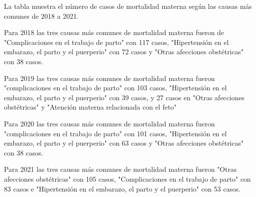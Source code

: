 \justifying La tabla muestra el número de casos de mortalidad materna según las causas más comunes de 2018 a 2021. 

Para 2018 las tres causas más comunes de mortalidad materna fueron de  "Complicaciones en el trabajo de parto" con 117 casos, "Hipertensión en el embarazo, el parto y el puerperio" con 72 casos y "Otras afecciones obstétricas" con 38 casos. 

Para 2019 las tres causas más comunes de mortalidad materna fueron "complicaciones en el trabajo de parto" con 103 casos, "Hipertensión en el embarazo, el parto y el puerperio" con 39 casos, y 27 casos en "Otras afecciones obstétricas" y "Atención materna relacionada con el feto"

Para 2020 las tres causas más comunes de mortalidad materna fueron "complicaciones en el trabajo de parto" con 101 casos, "Hipertensión en el embarazo, el parto y el puerperio" con 63 casos y "Otras afecciones obstétricas" con 38 casos. 

Para 2021 las tres causas más comunes de mortalidad materna fueron "Otras afecciones obstétricas" con 105 casos, "Complicaciones en el trabajo de parto" con 83 casos e "Hipertensión en el embarazo, el parto y el puerperio" con 53 casos.